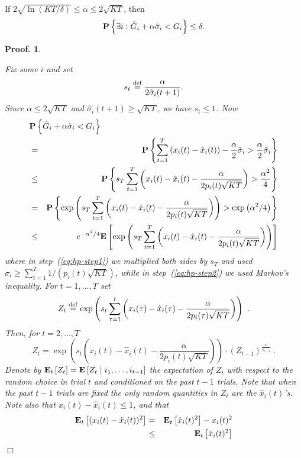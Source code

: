 \documentclass[12pt]{article}
\newcommand{\E}{\mbox{\rm\bf E}}
\newcommand{\expb}[1]{\exp\left(#1\right)}
\newcommand{\defeq}{\stackrel{\rm def}{=}}
\newcommand{\prop}[1]{\mbox{\bf P}\left\{#1\right\}}
\newcommand{\Et}[1]{\mbox{\bf E$_t$}\left[#1\right]}
\newcommand{\x}[2]{x_{#1}({#2})}
\newcommand{\hsigma}[2]{\hat{\sigma}_{#1}({#2})}
\newcommand{\p}[2]{p_{#1}(#2)}
\newcommand{\hx}[2]{\hat{x}_{#1}(#2)}
\newtheorem{pproof}{Proof.}
\newenvironment{proof}{
\begin{pproof}
        \begin{rm}\begin{rm}}{
        \hspace*{\fill} $\Box$
        \end{rm}\end{rm}
        \end{pproof}
}
\begin{document}
\begin{lemma} \label{l:hp}
If $2\sqrt{\ln(KT/\delta)}\leq\alpha\leq 2\sqrt{KT}$, then
\[ \prop{\exists i: \hat{G}_i + \alpha\hat{\sigma}_i < G_i} 
   \leq \delta. \]
\end{lemma}
\begin{proof}
Fix some $i$ and set 
\[ s_t \defeq \frac{\alpha}{2\hsigma{i}{t+1}}. \]
Since $\alpha \leq 2\sqrt{KT}$ and $\hsigma{i}{t+1} \geq \sqrt{KT}$,
we have $s_t \leq 1$. Now
\begin{eqnarray}
\nonumber
\lefteqn{\prop{\hat{G}_i + \alpha\hat{\sigma}_i < G_i}}\\
\nonumber
& = & \prop{\sum_{t=1}^T \left(\x{i}{t} - \hx{i}{t}\right) 
               - \frac{\alpha}{2}\hat{\sigma}_i
         > \frac{\alpha}{2}\hat{\sigma}_i}\\
\label{eq:hp-step1}
& \leq & \prop{s_T\sum_{t=1}^T \left(\x{i}{t} - \hx{i}{t} 
               - \frac{\alpha}{2\p{i}{t}\sqrt{KT}} \right)
         > \frac{\alpha^2}{4}}\\
\nonumber
& = & \prop{\expb{s_T \sum_{t=1}^T \left(\x{i}{t} - \hx{i}{t}
               - \frac{\alpha}{2\p{i}{t}\sqrt{KT}} \right)}
         > \expb{\alpha^2/4}} \\
\label{eq:hp-step2}
& \leq & e^{-\alpha^2/4}\E\left[\expb{s_T \sum_{t=1}^T \left(\x{i}{t} - \hx{i}{t}
               - \frac{\alpha}{2\p{i}{t}\sqrt{KT}}\right)}\right]
\end{eqnarray}
where in step~(\ref{eq:hp-step1}) we multiplied both sides by $s_T$ and
used $\hat{\sigma}_i \geq \sum_{t=1}^T 1/(\p{i}{t}\sqrt{KT})$, while in
step~(\ref{eq:hp-step2}) we used Markov's inequality.
For $t=1,\ldots,T$ set
\[ Z_t \defeq \expb{s_t \sum_{\tau=1}^t \left(\x{i}{\tau} - \hx{i}{\tau} 
               - \frac{\alpha}{2\p{i}{\tau}\sqrt{KT}}\right)}~. \]
Then, for $t=2,\ldots,T$
\[ Z_t = \expb{s_t \left(\x{i}{t} - \hx{i}{t} 
               - \frac{\alpha}{2\p{i}{t}\sqrt{KT}}\right)} 
         \cdot (Z_{t-1})^{\frac{s_t}{s_{t-1}}}~. \]               
Denote by $\Et{Z_t}=\E\left[Z_t \mid i_1,\ldots,i_{t-1}\right]$ the expectation
of $Z_t$ with respect to the random choice in trial $t$ and conditioned on the past
$t-1$ trials.  Note that when the past $t-1$ trials are fixed the only random
quantities in $Z_t$ are %
the $\hx{i}{t}$'s.
Note also that $\x{i}{t}-\hx{i}{t} \leq 1$,
and that
\begin{eqnarray}
\Et{(\x{i}{t}-\hx{i}{t})^2} &=& \Et{\hx{i}{t}^2} - \x{i}{t}^2
\nonumber\\
&\leq&
\Et{\hx{i}{t}^2}
\nonumber\\

\end{eqnarray}
\end{proof}
\end{document}
